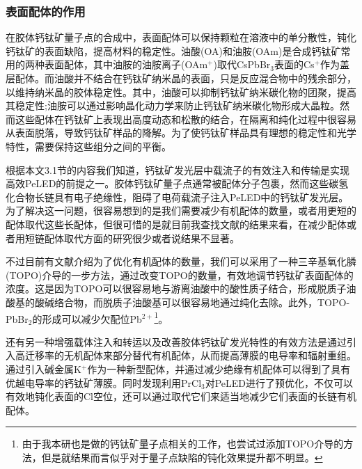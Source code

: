 \documentclass{phyasgn}\usepackage{nag}
\begin{document}
\subsubsection{表面配体的作用}
\par 在胶体钙钛矿量子点的合成中，表面配体可以保持颗粒在溶液中的单分散性，钝化钙钛矿的表面缺陷，提高材料的稳定性。油酸(OA)和油胺(OAm)是合成钙钛矿常用的两种表面配体，其中油胺的油胺离子(OAm$^+$)取代CsPbBr$_3$表面的Cs$^+$作为盖层配体。而油酸并不结合在钙钛矿纳米晶的表面，只是反应混合物中的残余部分，以维持纳米晶的胶体稳定性。其中，油酸可以抑制钙钛矿纳米碳化物的团聚，提高其稳定性;油胺可以通过影响晶化动力学来防止钙钛矿纳米碳化物形成大晶粒。然而这些配体在钙钛矿上表现出高度动态和松散的结合，在隔离和纯化过程中很容易从表面脱落，导致钙钛矿样品的降解。为了使钙钛矿样品具有理想的稳定性和光学特性，需要保持这些组分之间的平衡。
\par 根据本文3.1节的内容我们知道，钙钛矿发光层中载流子的有效注入和传输是实现高效PeLED的前提之一。胶体钙钛矿量子点通常被配体分子包裹，然而这些碳氢化合物长链具有电子绝缘性，阻碍了电荷载流子注入PeLED中的钙钛矿发光层。为了解决这一问题，很容易想到的是我们需要减少有机配体的数量，或者用更短的配体取代这些长配体，但很可惜的是就目前我查找文献的结果来看，在减少配体或者用短链配体取代方面的研究很少或者说结果不显著。
\par 不过目前有文献介绍为了优化有机配体的数量，我们可以采用了一种三辛基氧化膦(TOPO)介导的一步方法\cite{peng2020effective}，通过改变TOPO的数量，有效地调节钙钛矿表面配体的浓度。这是因为TOPO可以很容易地与游离油酸中的酸性质子结合，形成脱质子油酸基的酸碱络合物，而脱质子油酸基可以很容易地通过纯化去除。此外，TOPO-PbBr$_2$的形成可以减少欠配位Pb$^{2+}$\footnote{由于我本研也是做的钙钛矿量子点相关的工作，也尝试过添加TOPO介导的方法，但是就结果而言似乎对于量子点缺陷的钝化效果提升都不明显。}。
\par 还有另一种增强载体注入和转运以及改善胶体钙钛矿发光特性的有效方法是通过引入高迁移率的无机配体来部分替代有机配体，从而提高薄膜的电导率和辐射重组。通过引入碱金属K$^{+}$作为一种新型配体，并通过减少绝缘有机配体可以得到了具有优越电导率的钙钛矿薄膜\cite{yang2020efficient}。同时发现利用PrCl$_{3}$对PeLED进行了预优化，不仅可以有效地钝化表面的Cl空位，还可以通过取代它们来适当地减少它们表面的长链有机配体。
\clearpage
\end{document}
